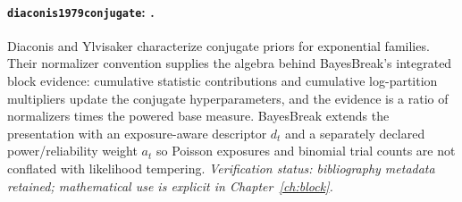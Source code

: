 
\paragraph{\texttt{diaconis1979conjugate}: \citet{diaconis1979conjugate}.}
Diaconis and Ylvisaker characterize conjugate priors for exponential families. Their normalizer convention supplies the algebra behind BayesBreak's integrated block evidence: cumulative statistic contributions and cumulative log-partition multipliers update the conjugate hyperparameters, and the evidence is a ratio of normalizers times the powered base measure. BayesBreak extends the presentation with an exposure-aware descriptor $d_t$ and a separately declared power/reliability weight $a_t$ so Poisson exposures and binomial trial counts are not conflated with likelihood tempering. \textit{Verification status: bibliography metadata retained; mathematical use is explicit in Chapter~\ref{ch:block}.}
